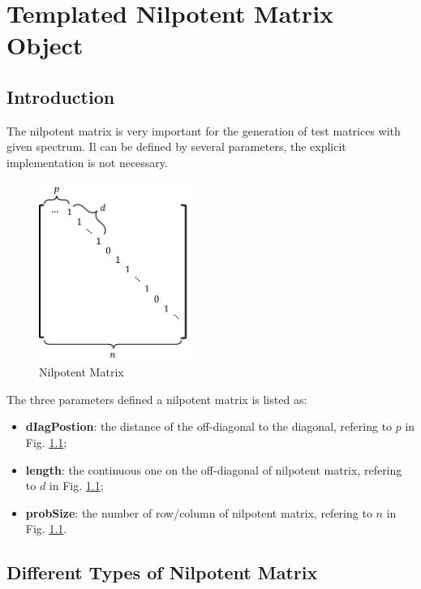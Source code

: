 \documentclass[a4paper, 10 pt]{report}
\begin{document}
	\newpage
	\chapter{Templated  Nilpotent Matrix Object}
	\section{Introduction}
	The nilpotent matrix is very important for the generation of test matrices with given spectrum. Il can be defined by several parameters, the explicit implementation is not necessary.
	
	\begin{figure}[htbp]
		\label{fig:nilpotent matrix}
		\caption{Nilpotent Matrix}
		\centering
		\includegraphics[width=5cm]{nilpotent_matrix.pdf}
	\end{figure}

	The three parameters defined a nilpotent matrix is listed as:
	
	\begin{itemize}
		\item \textbf{dIagPostion}: the distance of the off-diagonal to the diagonal, refering to $p$ in Fig. \ref{fig:nilpotent matrix};
		\item \textbf{length}: the continuous one on the off-diagonal of nilpotent matrix, refering to $d$ in Fig. \ref{fig:nilpotent matrix};
		\item \textbf{probSize}: the number of row/column of nilpotent matrix, refering to $n$ in Fig. \ref{fig:nilpotent matrix}.
	\end{itemize}

	\section{Different Types of Nilpotent Matrix}
\end{document}
